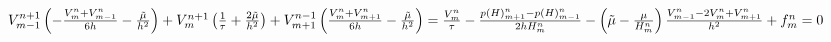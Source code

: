 $
V_{m-1}^{n+1}\left(-\frac{V_m^n + V_{m-1}^n}{6h} - \frac{\tilde{\mu}}{h^2}\right) + V_m^{n+1}\left(\frac{1}{\tau} + \frac{2\tilde{\mu}}{h^2}\right) + V_{m+1}^{n-1}\left(\frac{V_m^n + V_{m+1}^n}{6h} - \frac{\tilde{\mu}}{h^2}\right)  = \\
\frac{V_m^n}{\tau} - \frac{p(H)_{m+1}^n - p(H)_{m-1}^n}{2hH_m^n} - \left(\tilde{\mu}-\frac{\mu}{H_m^n}\right)\frac{V_{m-1}^n - 2V_m^n + V_{m+1}^n }{h^2} + f_m^n = 0
$

\newpage









